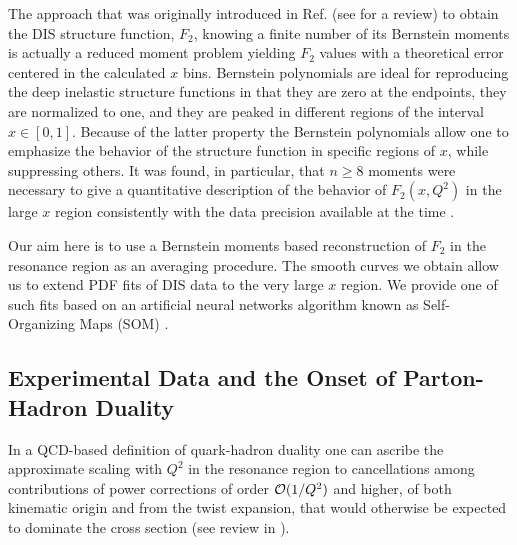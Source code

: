 \documentclass[
twocolumn,
aps,prd,
nofootinbib,
superscriptaddress,
showpacs,ligh
tightenlines, 
]{revtex4}
\begin{document}
The approach that was originally introduced in Ref.\cite{Yndurain:1977wz} (see \cite{Pennington:1982kr} for a review)
to obtain the DIS structure function, $F_2$, knowing a finite number of its Bernstein moments is actually a reduced moment problem yielding $F_2$ values with a theoretical error centered in the calculated $x$ bins. Bernstein polynomials are ideal 
for reproducing the deep inelastic structure functions in that they are zero at the
endpoints, they are normalized to one, and they are peaked in different regions
of the interval $x \in [0,1]$. Because of the latter property the Bernstein
polynomials allow one to emphasize the behavior of the structure function in
specific regions of $x$, while suppressing others.  
It was found, in particular, that $n \geq 8$ moments were necessary to give a  quantitative
description of the behavior of $F_2(x,Q^2)$ in the large $x$ region consistently with the  data precision available at the time \cite{Yndurain:1977wz}. 

Our aim here is to use a Bernstein moments based reconstruction of $F_2$ in the resonance region as an averaging procedure. 
The smooth curves we obtain allow us to extend PDF fits 
of DIS data to the very large $x$ region. We provide one of such fits based on an artificial neural networks algorithm known as Self-Organizing Maps (SOM) \cite{Askanazi:2014gxa,Honkanen:2008mb}. 

\subsection{Experimental Data and the Onset of Parton-Hadron Duality}
In a QCD-based definition of quark-hadron duality one can ascribe the approximate scaling with $Q^2$ in the resonance region to cancellations among contributions of power corrections of order ${\cal O}(1/Q^2)$ and higher, of both kinematic origin and from the twist expansion, that would otherwise be expected to dominate the cross section  (see review in \cite{Melnitchouk:2005zr}). 
\end{document}
